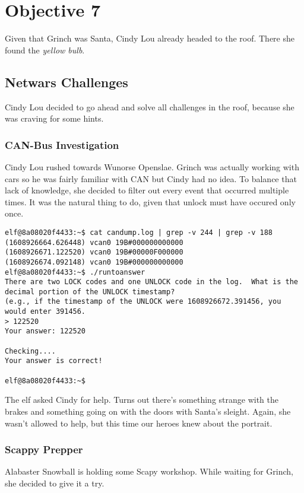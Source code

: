 \chapter{Objective 7}
Given that Grinch was Santa, Cindy Lou already headed to the roof. There she found the \textit{yellow bulb}.

\section{Netwars Challenges}
Cindy Lou decided to go ahead and solve all challenges in the roof, because she was craving for some hints.

\subsection{CAN-Bus Investigation}
Cindy Lou rushed towards {\color{codegreen}Wunorse Openslae}. Grinch was actually working with cars so he was fairly familiar with CAN but Cindy had no idea.
To balance that lack of knowledge, she decided to filter out every event that occurred multiple times. It was the natural thing to do, given that unlock must have occured only once.
\begin{verbatim}
elf@8a08020f4433:~$ cat candump.log | grep -v 244 | grep -v 188
(1608926664.626448) vcan0 19B#000000000000
(1608926671.122520) vcan0 19B#00000F000000
(1608926674.092148) vcan0 19B#000000000000
elf@8a08020f4433:~$ ./runtoanswer
There are two LOCK codes and one UNLOCK code in the log.  What is the decimal portion of the UNLOCK timestamp?
(e.g., if the timestamp of the UNLOCK were 1608926672.391456, you would enter 391456.
> 122520
Your answer: 122520

Checking....
Your answer is correct!

elf@8a08020f4433:~$
\end{verbatim}

The elf asked Cindy for help. Turns out there's something strange with the brakes and something going on with the doors with Santa's sleight. Again, she wasn't allowed to help, but this time our heroes knew about the portrait.

\subsection{Scappy Prepper}
{\color{codegreen}Alabaster Snowball} is holding some Scapy workshop. While waiting for Grinch, she decided to give it a try.

